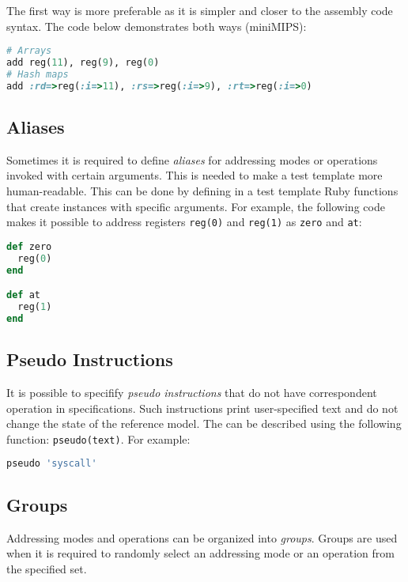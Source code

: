\documentclass[oneside,final,12pt]{extreport}
\begin{document}
The first way is more preferable as it is simpler and closer to the assembly code syntax.
The code below demonstrates both ways (miniMIPS):

\begin{lstlisting}[language=ruby]
# Arrays
add reg(11), reg(9), reg(0)
# Hash maps
add :rd=>reg(:i=>11), :rs=>reg(:i=>9), :rt=>reg(:i=>0)
\end{lstlisting}

\subsection{Aliases}

Sometimes it is required to define \emph{aliases} for addressing modes or operations
invoked with certain arguments. This is needed to make a test template more 
human-readable. This can be done by defining in a test template Ruby functions that
create instances with specific arguments. For example, the following code makes it
possible to address registers \texttt{reg(0)} and \texttt{reg(1)} as
\texttt{zero} and \texttt{at}:

\begin{lstlisting}[language=ruby]
def zero
  reg(0)
end

def at
  reg(1)
end
\end{lstlisting}

\subsection{Pseudo Instructions}

It is possible to specifify \emph{pseudo instructions} that do not have correspondent
operation in specifications. Such instructions print user-specified text and do not
change the state of the reference model. The can be described using the following
function: \texttt{pseudo(text)}. For example:

\begin{lstlisting}[language=ruby]
pseudo 'syscall'
\end{lstlisting}

\subsection{Groups}

Addressing modes and operations can be organized into \emph{groups}. Groups are
used when it is required to randomly select an addressing mode or an operation
from the specified set.
\end{document}
